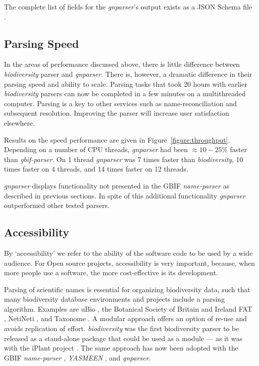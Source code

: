 \documentclass{bmcart}
\begin{document}
The complete list of fields for the \textit{gnparser}'s output exists as
a JSON Schema file \cite{gnparser-json}.

\subsection*{Parsing Speed}

In the areas of performance discussed above, there is little difference between
\textit{biodiversity} parser and \textit{gnparser}. There is, however, a
dramatic difference in their parsing speed and ability to scale. Parsing tasks
that took 20 hours with earlier \textit{biodiversity} parsers can now be
completed in a few minutes on a multithreaded computer. Parsing is a key to
other services such as name-reconciliation and subsequent resolution.
Improving the parser will increase user satisfaction elsewhere.

Results on the speed performance are given in Figure~\ref{figure:throughput}.
Depending on a number of CPU threads, \textit{gnparser} had been
$\approx10-25\%$ faster than \textit{gbif-parser}. On 1 thread
\textit{gnparser} was 7 times faster than \textit{biodiversity}, 10 times
faster on 4 threads, and 14 times faster on 12 threads.

\textit{gnparser} displays functionality not presented in the GBIF
\textit{name-parser} as described in previous sections. In spite of this
additional functionality \textit{gnparser} outperformed other tested parsers.

\subsection*{Accessibility}

By `accessibility' we refer to the ability of the software code to be used by a
wide audience. For Open source projects, accessibility is very important,
because, when more people use a software, the more cost-effective is its
development.

Parsing of scientific names is essential for organizing biodiversity data, such
that many biodiversity database environments and projects include a parsing
algorithm.  Examples are uBio \cite{ubio:parser}, the Botanical Society of
Britain and Ireland \cite{botsociety:parser} FAT \cite{Sautter2006}, NetiNeti
\cite{Akella2012}, and Taxonome \cite{Kluyver2013}. A modular approach offers
an option of re-use and avoids replication of effort. \textit{biodiversity} was
the first biodiversity parser to be released as a stand-alone package that
could be used as a module --- as it was with the iPlant project \cite{Boyle2013}.
The same approach has now been adopted with the GBIF \textit{name-parser}
\cite{gbifNameParser}, \textit{YASMEEN} \cite{VandenBerghe2015}, and
\textit{gnparser}.
\end{document}
